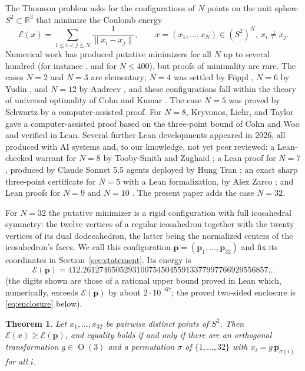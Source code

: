 \documentclass[11pt]{amsart}
\newtheorem{theorem}{Theorem}[section]
\theoremstyle{definition}
\theoremstyle{remark}
\newcommand{\R}{\mathbb{R}}
\newcommand{\Sph}{S^{2}}
\newcommand{\norm}[1]{\lVert #1\rVert}
\newcommand{\E}{\mathcal{E}}
\newcommand{\cand}{\mathbf{p}}
\DeclareMathOperator{\OO}{O}
\begin{document}
The Thomson problem \cite{Thomson1904} asks for the configurations of $N$ points on the unit sphere $\Sph\subset\R^{3}$ that minimize the Coulomb energy
\begin{equation}\label{eq:energy}
  \E(x)=\sum_{1\le i<j\le N}\frac{1}{\norm{x_i-x_j}},\qquad x=(x_1,\dots,x_N)\in(\Sph)^{N},\ x_i\ne x_j .
\end{equation}
Numerical work has produced putative minimizers for all $N$ up to several hundred (for instance \cite{ErberHockney1991}, and \cite{WalesUlker2006} for $N\le400$), but proofs of minimality are rare. The cases $N=2$ and $N=3$ are elementary; $N=4$ was settled by F\"oppl \cite{Foppl1912}, $N=6$ by Yudin \cite{Yudin1993}, and $N=12$ by Andreev \cite{Andreev1996}, and these configurations fall within the theory of universal optimality of Cohn and Kumar \cite{CohnKumar2007}. The case $N=5$ was proved by Schwartz \cite{Schwartz2013} by a computer-assisted proof. For $N=8$, Kryvonos, Liehr, and Taylor \cite{KLT2026} gave a computer-assisted proof based on the three-point bound of Cohn and Woo and verified in Lean. Several further Lean developments appeared in 2026, all produced with AI systems and, to our knowledge, not yet peer reviewed: a Lean-checked warrant for $N=8$ by Tooby-Smith and Zughaid \cite{TZWarrant}; a Lean proof for $N=7$, produced by Claude Sonnet 5.5 agents deployed by Hung Tran \cite{TranN7}; an exact sharp three-point certificate for $N=5$ with a Lean formalization, by Alex Zarco \cite{ZarcoN5}; and Lean proofs for $N=9$ \cite{ThomsonN9} and $N=10$ \cite{GrahamThomson102026}. The present paper adds the case $N=32$.

For $N=32$ the putative minimizer is a rigid configuration with full icosahedral symmetry: the twelve vertices of a regular icosahedron together with the twenty vertices of its dual dodecahedron, the latter being the normalized centers of the icosahedron's faces. We call this configuration $\cand=(\cand_1,\dots,\cand_{32})$ and fix its coordinates in Section~\ref{sec:statement}. Its energy is
\begin{equation}\label{eq:Ep}
  \E(\cand)=412.261274650529310075450455913377997766929556857\ldots
\end{equation}
(the digits shown are those of a rational upper bound proved in Lean which, numerically, exceeds $\E(\cand)$ by about $2\cdot 10^{-67}$; the proved two-sided enclosure is \eqref{eq:enclosure} below).

\begin{theorem}\label{thm:main}
Let $x_1,\dots,x_{32}$ be pairwise distinct points of $\Sph$. Then $\E(x)\ge\E(\cand)$, and equality holds if and only if there are an orthogonal transformation $g\in\OO(3)$ and a permutation $\sigma$ of $\{1,\dots,32\}$ with $x_i=g\,\cand_{\sigma(i)}$ for all $i$.
\end{theorem}
\end{document}

